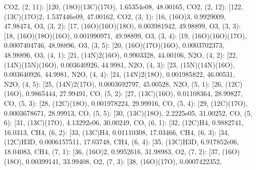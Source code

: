 \documentclass[letterpaper,10pt,english]{sphinxmanual}
\begin{document}
\begin{fulllineitems}
\textquotesingle{}CO2\textquotesingle{}{]}, (2, 11): {[}120, \textquotesingle{}(18O)(13C)(17O)\textquotesingle{}, 1.65354e\sphinxhyphen{}08, 48.00165, \textquotesingle{}CO2\textquotesingle{}{]}, (2, 12): {[}122, \textquotesingle{}(13C)(17O)2\textquotesingle{}, 1.537446e\sphinxhyphen{}09, 47.00162, \textquotesingle{}CO2\textquotesingle{}{]}, (3, 1): {[}16, \textquotesingle{}(16O)3\textquotesingle{}, 0.9929009, 47.98474, \textquotesingle{}O3\textquotesingle{}{]}, (3, 2): {[}17, \textquotesingle{}(16O)(16O)(18O)\textquotesingle{}, 0.003981942, 49.98899, \textquotesingle{}O3\textquotesingle{}{]}, (3, 3): {[}18, \textquotesingle{}(16O)(18O)(16O)\textquotesingle{}, 0.001990971, 49.98899, \textquotesingle{}O3\textquotesingle{}{]}, (3, 4): {[}19, \textquotesingle{}(16O)(16O)(17O)\textquotesingle{}, 0.0007404746, 48.98896, \textquotesingle{}O3\textquotesingle{}{]}, (3, 5): {[}20, \textquotesingle{}(16O)(17O)(16O)\textquotesingle{}, 0.0003702373, 48.98896, \textquotesingle{}O3\textquotesingle{}{]}, (4, 1): {[}21, \textquotesingle{}(14N)2(16O)\textquotesingle{}, 0.9903328, 44.00106, \textquotesingle{}N2O\textquotesingle{}{]}, (4, 2): {[}22, \textquotesingle{}(14N)(15N)(16O)\textquotesingle{}, 0.003640926, 44.9981, \textquotesingle{}N2O\textquotesingle{}{]}, (4, 3): {[}23, \textquotesingle{}(15N)(14N)(16O)\textquotesingle{}, 0.003640926, 44.9981, \textquotesingle{}N2O\textquotesingle{}{]}, (4, 4): {[}24, \textquotesingle{}(14N)2(18O)\textquotesingle{}, 0.001985822, 46.00531, \textquotesingle{}N2O\textquotesingle{}{]}, (4, 5): {[}25, \textquotesingle{}(14N)2(17O)\textquotesingle{}, 0.0003692797, 45.00528, \textquotesingle{}N2O\textquotesingle{}{]}, (5, 1): {[}26, \textquotesingle{}(12C)(16O)\textquotesingle{}, 0.9865444, 27.99491, \textquotesingle{}CO\textquotesingle{}{]}, (5, 2): {[}27, \textquotesingle{}(13C)(16O)\textquotesingle{}, 0.01108364, 28.99827, \textquotesingle{}CO\textquotesingle{}{]}, (5, 3): {[}28, \textquotesingle{}(12C)(18O)\textquotesingle{}, 0.001978224, 29.99916, \textquotesingle{}CO\textquotesingle{}{]}, (5, 4): {[}29, \textquotesingle{}(12C)(17O)\textquotesingle{}, 0.0003678671, 28.99913, \textquotesingle{}CO\textquotesingle{}{]}, (5, 5): {[}30, \textquotesingle{}(13C)(18O)\textquotesingle{}, 2.2225e\sphinxhyphen{}05, 31.00252, \textquotesingle{}CO\textquotesingle{}{]}, (5, 6): {[}31, \textquotesingle{}(13C)(17O)\textquotesingle{}, 4.13292e\sphinxhyphen{}06, 30.00249, \textquotesingle{}CO\textquotesingle{}{]}, (6, 1): {[}32, \textquotesingle{}(12C)H4\textquotesingle{}, 0.9882741, 16.0313, \textquotesingle{}CH4\textquotesingle{}{]}, (6, 2): {[}33, \textquotesingle{}(13C)H4\textquotesingle{}, 0.01110308, 17.03466, \textquotesingle{}CH4\textquotesingle{}{]}, (6, 3): {[}34, \textquotesingle{}(12C)H3D\textquotesingle{}, 0.0006157511, 17.03748, \textquotesingle{}CH4\textquotesingle{}{]}, (6, 4): {[}35, \textquotesingle{}(13C)H3D\textquotesingle{}, 6.917852e\sphinxhyphen{}06, 18.04083, \textquotesingle{}CH4\textquotesingle{}{]}, (7, 1): {[}36, \textquotesingle{}(16O)2\textquotesingle{}, 0.9952616, 31.98983, \textquotesingle{}O2\textquotesingle{}{]}, (7, 2): {[}37, \textquotesingle{}(16O)(18O)\textquotesingle{}, 0.00399141, 33.99408, \textquotesingle{}O2\textquotesingle{}{]}, (7, 3): {[}38, \textquotesingle{}(16O)(17O)\textquotesingle{}, 0.0007422352, 
\end{fulllineitems}
\end{document}
